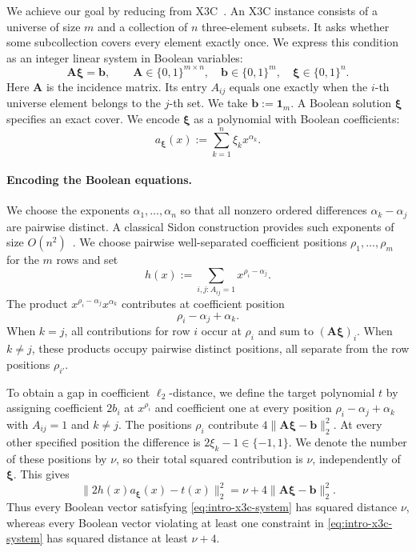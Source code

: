 We achieve our goal by reducing from X3C~\cite{GareyJohnson}.
An X3C instance consists of a universe of size \(m\) and a
collection of \(n\) three-element subsets.  It asks whether some subcollection
covers every element exactly once.  We express this condition as an integer
linear system in Boolean variables:
\begin{equation}
\label{eq:intro-x3c-system}
 \mathbf A\boldsymbol\xi=\mathbf b,
 \qquad
 \mathbf A\in\{0,1\}^{m\times n},\quad
 \mathbf b\in\{0,1\}^m,\quad
 \boldsymbol\xi\in\{0,1\}^n.
\end{equation}
Here \(\mathbf A\) is the incidence matrix.  Its entry
\(A_{ij}\) equals one exactly when the \(i\)-th universe element belongs to
the \(j\)-th set.  We take
\(\mathbf b\mathrel{:=}\mathbf 1_m\).  A Boolean solution
\(\boldsymbol\xi\) specifies an
exact cover.  We encode \(\boldsymbol\xi\) as
a polynomial with Boolean coefficients:
\[
 a_{\boldsymbol\xi}(x)
 :=\sum_{k=1}^n\xi_kx^{\alpha_k}.
\]

\paragraph{Encoding the Boolean equations.}
We choose the exponents \(\alpha_1,\ldots,\alpha_n\) so that
all nonzero ordered differences \(\alpha_k-\alpha_j\)
are pairwise distinct.
A classical Sidon
construction provides such exponents of size
\(O(n^2)\)~\cite{ErdosTuran41}.
We choose pairwise well-separated coefficient positions
\(\rho_1,\ldots,\rho_m\) for the \(m\) rows and set
\[
 h(x):=\sum_{i,j:A_{ij}=1}x^{\rho_i-\alpha_j}.
\]
The product
\(x^{\rho_i-\alpha_j}x^{\alpha_k}\) contributes at coefficient position
\[
 \rho_i-\alpha_j+\alpha_k.
\]
When \(k=j\), all contributions for row \(i\) occur at
\(\rho_i\) and sum to \((\mathbf A\boldsymbol\xi)_i\).  When \(k\neq j\),
these products occupy pairwise distinct positions, all separate from the row
positions \(\rho_{i'}\).

To obtain a gap in coefficient \(\ell_2\)-distance, we define the
target polynomial \(t\) by assigning coefficient \(2b_i\) at
\(x^{\rho_i}\) and coefficient one at every position
\(\rho_i-\alpha_j+\alpha_k\) with \(A_{ij}=1\) and \(k\neq j\).  The
positions \(\rho_i\) contribute
\(4\|\mathbf A\boldsymbol\xi-\mathbf b\|_2^2\).  At every other specified
position the difference is \(2\xi_k-1\in\{-1,1\}\).  We denote the number of
these positions by \(\nu\), so their total squared contribution is \(\nu\),
independently of \(\boldsymbol\xi\).  This gives
\[
 \|2h(x)a_{\boldsymbol\xi}(x)-t(x)\|_2^2
 =\nu+4\|\mathbf A\boldsymbol\xi-\mathbf b\|_2^2.
\]
Thus every Boolean vector satisfying
\eqref{eq:intro-x3c-system} has squared distance \(\nu\), whereas every Boolean
vector violating at least one constraint in \eqref{eq:intro-x3c-system} has
squared distance at least \(\nu+4\).

